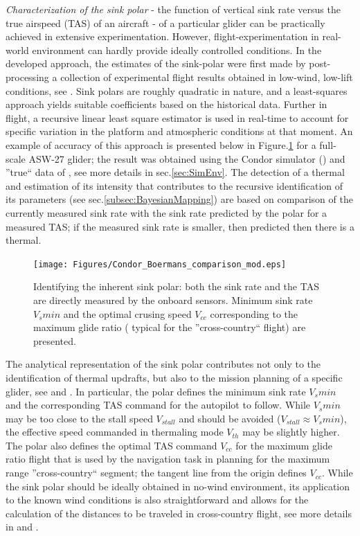 \documentclass{ifacconf}
\begin{document}
\emph{Characterization of the sink polar} - the function of vertical sink
rate versus the true airspeed (TAS) of an aircraft - of a particular glider
can be practically achieved in extensive experimentation. However,
flight-experimentation in real-world environment can hardly provide ideally
controlled conditions. In the developed approach, the estimates of the
sink-polar were first made by post-processing a collection of experimental
flight results obtained in low-wind, low-lift conditions, see
\cite{AKlass_JGCD:2012}. Sink polars are roughly quadratic in nature, and a
least-squares approach yields suitable coefficients based on the historical
data. Further in flight, a recursive linear least square estimator is used in
real-time to account for specific variation in the platform and atmospheric
conditions at that moment. An example of accuracy of this approach is
presented below in Figure.\ref{fig:SinkPolar} for a full-scale ASW-27 glider;
the result was obtained using the Condor simulator
(\cite{Condor:2013:Online}) and ''true`` data of \cite{Boermans:1994}, see
more details in sec.\ref{sec:SimEnv}. The detection of a thermal and
estimation of its intensity that contributes to the recursive identification
of its parameters (see sec.\ref{subsec:BayesianMapping}) are based on
comparison of the currently measured sink rate with the sink rate predicted
by the polar for a measured TAS; if the measured sink rate is smaller, then
predicted then there is a thermal.
\begin{figure}[thpb]
  \centering
  \texttt{[image: Figures/Condor\_Boermans\_comparison\_mod.eps]}
  \caption{Identifying the inherent sink polar: both the sink rate and the
  TAS are directly measured by the onboard sensors. Minimum sink rate
  $V_s min$ and the optimal crusing speed $V_{cc}$  corresponding to
  the maximum glide ratio ( typical for the ''cross-country`` flight) are
  presented.}
  \label{fig:SinkPolar}
\end{figure}
The analytical representation of the sink polar contributes not only to the
identification of thermal updrafts, but also to the mission planning of a
specific glider, see \cite{Piggott:1997} and \cite{FAA:2011}. In particular,
the polar defines the minimum sink rate $V_{s}min$ and the corresponding TAS
command for the autopilot to follow. While $V_{s}min$ may be too close to the
stall speed $V_{stall}$ and should be avoided ($V_{stall} \approx V_{s}min$),
the effective speed commanded in thermaling mode $V_{th}$ may be slightly
higher. The polar also defines the optimal TAS command $V_{cc}$ for the
maximum glide ratio flight that is used by the navigation task in planning
for the maximum range ''cross-country`` segment; the tangent line from the
origin defines $V_{cc}$. While the sink polar should be ideally obtained in
no-wind environment, its application to the known wind conditions is also
straightforward and allows for the calculation of the distances to be
traveled in cross-country flight, see more details in \cite{Piggott:1997} and
\cite{FAA:2011}.
\end{document}
